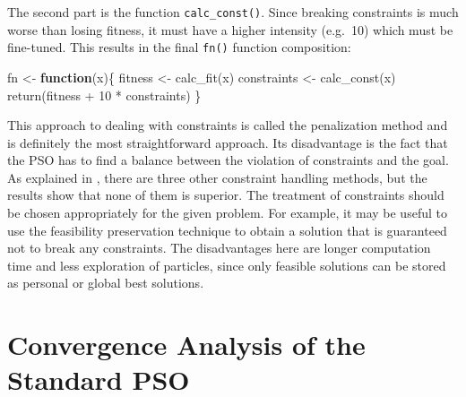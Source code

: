 \documentclass[
  oneside, a4paper, 12pt, openany]{book}
\newenvironment{Shaded}{\begin{snugshade}}{\end{snugshade}}
\newcommand{\ControlFlowTok}[1]{\textcolor[rgb]{0.13,0.29,0.53}{\textbf{#1}}}
\newcommand{\DecValTok}[1]{\textcolor[rgb]{0.00,0.00,0.81}{#1}}
\newcommand{\FunctionTok}[1]{\textcolor[rgb]{0.00,0.00,0.00}{#1}}
\newcommand{\NormalTok}[1]{#1}
\newcommand{\OtherTok}[1]{\textcolor[rgb]{0.56,0.35,0.01}{#1}}
\newcommand{\SpecialCharTok}[1]{\textcolor[rgb]{0.00,0.00,0.00}{#1}}
\theoremstyle{definition}
\theoremstyle{definition}
\theoremstyle{definition}
\theoremstyle{definition}
\theoremstyle{remark}
\begin{document}
\normalsize\vspace{0.1cm}

The second part is the function \texttt{calc\_const()}. Since breaking constraints is much worse than losing fitness, it must have a higher intensity (e.g.~10) which must be fine-tuned. This results in the final \texttt{fn()} function composition:

\vspace{0.1cm}\fontsize{11}{12}\selectfont

\begin{Shaded}
\begin{Highlighting}[]
\NormalTok{fn }\OtherTok{\textless{}{-}} \ControlFlowTok{function}\NormalTok{(x)\{}
\NormalTok{  fitness }\OtherTok{\textless{}{-}} \FunctionTok{calc\_fit}\NormalTok{(x)}
\NormalTok{  constraints }\OtherTok{\textless{}{-}} \FunctionTok{calc\_const}\NormalTok{(x)}
  \FunctionTok{return}\NormalTok{(fitness }\SpecialCharTok{+} \DecValTok{10} \SpecialCharTok{*}\NormalTok{ constraints)}
\NormalTok{\}}
\end{Highlighting}
\end{Shaded}

\normalsize\vspace{0.1cm}

This approach to dealing with constraints is called the penalization method and is definitely the most straightforward approach. Its disadvantage is the fact that the PSO has to find a balance between the violation of constraints and the goal. As explained in \citep{InSi2008}, there are three other constraint handling methods, but the results show that none of them is superior. The treatment of constraints should be chosen appropriately for the given problem. For example, it may be useful to use the feasibility preservation technique to obtain a solution that is guaranteed not to break any constraints. The disadvantages here are longer computation time and less exploration of particles, since only feasible solutions can be stored as personal or global best solutions.

\hypertarget{convergence-analysis-of-the-standard-pso}{%
\section{Convergence Analysis of the Standard PSO}\label{convergence-analysis-of-the-standard-pso}}
\end{document}
